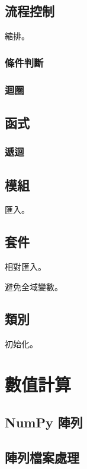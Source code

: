 \documentclass[a4paper,12pt]{book}
\begin{document}
\chapter{流程控制}

縮排。

\section{條件判斷}

\section{迴圈}

\chapter{函式}

\section{遞迴}

\chapter{模組}

匯入。

\chapter{套件}

相對匯入。

避免全域變數。

\chapter{類別}

初始化。

\part{數值計算}

\chapter{NumPy 陣列}

\chapter{陣列檔案處理}
\end{document}
